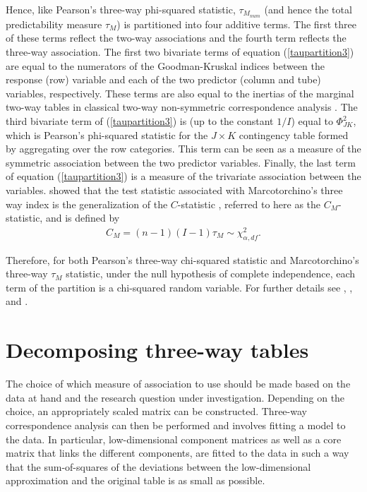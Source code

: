 \noindent Hence, like Pearson's three-way phi-squared statistic, $\tau_{M_{num}}$ (and hence the total predictability measure $\tau_{M}$) is partitioned into four additive terms. The first three of these terms reflect the two-way associations and the fourth term reflects the three-way association. The first two bivariate terms of equation (\ref{taupartition3}) are equal to the numerators of the Goodman-Kruskal indices \citep{goo54} between the response (row) variable and each of the two predictor (column and tube) variables, respectively. These terms are also equal to the inertias of the marginal two-way tables in classical two-way non-symmetric correspondence analysis \citep{lau84,dam89,kro99,tak08}. The third bivariate term of (\ref{taupartition3}) is (up to the constant $1/I$) equal to $\Phi^2_{JK}$, which is Pearson's phi-squared statistic for the $J\times K$ contingency table formed by aggregating over the row categories. This term can be seen as a measure of the symmetric association between the two predictor variables. Finally, the last term of equation (\ref{taupartition3}) is a  measure of the trivariate association between the variables. %
\citet{beh07} showed that the test statistic associated with Marcotorchino's three way index is the generalization of the $C$-statistic \citep{lig71}, referred to here as the $C_M$-statistic, and is defined by
\begin{eqnarray}
\label{eq:CM}
      C_M = \left(n-1\right) \left(I-1 \right) \tau_{M}\sim \chi^{2}_{\alpha, df} .
\end{eqnarray}

\noindent Therefore, for both Pearson's three-way chi-squared statistic and Marcotorchino's three-way $\tau_M$ statistic, under the null hypothesis of complete independence, each term of the partition is a chi-squared random variable. For further details see \citet[]{lig71}, \citet[]{beh07}, \citet[Section 11.5.2]{behlom14} and \citet[Section 7.5.2]{behlom21b}.


\section{Decomposing three-way tables}
\label{s.3}
The choice of which measure of association to use should be made based on the data at hand and the research question under investigation. Depending on the choice, an appropriately scaled matrix can be constructed. Three-way correspondence  analysis can then be performed and involves fitting a model to the data. In particular, low-dimensional component matrices as well as a core matrix that links the different components, are fitted to the data in such a way that the sum-of-squares of the deviations between the low-dimensional approximation and the original table is as small as possible.  

